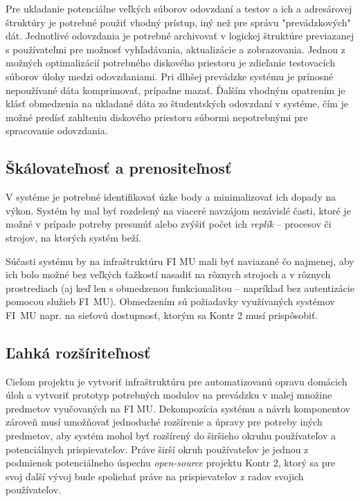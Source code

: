 \documentclass[
  digital, %
  oneside, %
  table,   %
  lof,     %
  lot,   %
]{fithesis3}
\begin{document}
Pre ukladanie potenciálne veľkých súborov odovzdaní a testov a ich a adresárovej štruktúry je potrebné použiť vhodný prístup, iný než pre správu "prevádzkových" dát. Jednotlivé odovzdania je potrebné archivovať v logickej štruktúre previazanej s používateľmi pre možnosť vyhľadávania, aktualizácie a zobrazovania. Jednou z možných optimalizácií potrebného diskového priestoru je zdieľanie testovacích súborov úlohy medzi odovzdaniami. Pri dlhšej prevádzke systému je prínosné nepoužívané dáta komprimovať, prípadne mazať. Ďalším vhodným opatrením je klásť obmedzenia na ukladané dáta zo študentských odovzdaní v systéme, čím je možné predísť zahlteniu diskového priestoru súbormi nepotrebnými pre spracovanie odovzdania.

\subsection{Škálovateľnosť a prenositeľnosť}

V systéme je potrebné identifikovať úzke body a minimalizovať ich dopady na výkon. Systém by mal byť rozdelený na viaceré navzájom nezávislé časti, ktoré je možné v prípade potreby presunúť alebo zvýšiť počet ich \emph{replík} -- procesov či strojov, na ktorých systém beží. 

Súčasti systému by na infraštruktúru FI MU mali byť naviazané čo najmenej, aby ich bolo možné bez veľkých ťažkostí nasadiť na rôznych strojoch a v rôznych prostrediach (aj keď len s obmedzenou funkcionalitou -- napríklad bez autentizácie pomocou služieb FI~MU). Obmedzením sú požiadavky využívaných systémov FI~MU napr. na sieťovú dostupnosť, ktorým sa Kontr 2 musí prispôsobiť.

\subsection{Ľahká rozšíriteľnosť}

Cieľom projektu je vytvoriť infraštruktúru pre automatizovanú opravu domácich úloh a vytvoriť prototyp potrebných modulov na prevádzku v malej množine predmetov vyučovaných na FI MU. Dekompozícia systému a návrh komponentov zároveň musí umožňovať jednoduché rozšírenie a úpravy pre potreby iných predmetov, aby systém mohol byť rozšírený do širšieho okruhu používateľov a potenciálnych prispievateľov. Práve širší okruh používateľov je jednou z podmienok potenciálneho úspechu \emph{open-source} projektu Kontr 2, ktorý sa pre svoj ďalší vývoj bude spoliehať práve na prispievateľov z radov svojich používateľov.
\end{document}
